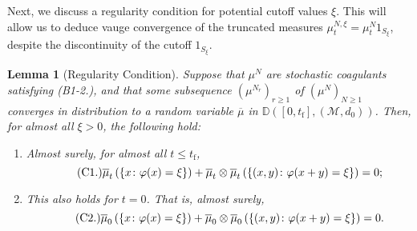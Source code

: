 \documentclass[11pt, notitlepage]{article}
\newtheorem{lem}[thm]{Lemma}
\begin{document}
Next, we discuss a regularity condition for potential cutoff values $\xi$. This will allow us to deduce vauge convergence of the truncated measures $\mu^{N,\xi}_t=\mu^N_t1_{S_\xi}$, despite the discontinuity of the cutoff $1_{S_\xi}$.
\begin{lem}[Regularity Condition]\label{lemma: regularity condition} Suppose that $\mu^N$ are stochastic coagulants satisfying (B1-2.), and that some subsequence $(\mu^{N_r})_{r\ge 1}$ of $(\mu^N)_{N\ge 1}$ converges in distribution to a random variable $\overline{\mu}$ in $\mathbb{D}([0,t_\mathrm{f}],(\mathcal{M},d_0))$. Then, for almost all $\xi>0$, the following hold: \begin{enumerate}[label=\roman{*}).]\item Almost surely, for  almost all $t\le t_\mathrm{f}$, \begin{equation} \label{eq: reg} \tag{{C1.}}
   \overline{\mu}_t\left(\left\{x\colon \varphi(x) = \xi\right\}\right) + 
    \overline{\mu}_t \otimes \overline{\mu}_t \left(\left\{(x,y) \colon \varphi(x+y) = \xi\right\}\right) = 0;
\end{equation} \item This also holds for $t=0$. That is, almost surely, \begin{equation} \label{eq: reg2} \tag{{C2.}}
   \overline{\mu}_0\left(\left\{x\colon \varphi(x) = \xi\right\}\right) + 
    \overline{\mu}_0 \otimes \overline{\mu}_0 \left(\left\{(x,y) \colon \varphi(x+y) = \xi\right\}\right) = 0. 

\end{equation}
\end{enumerate}
\end{lem}
\end{document}
